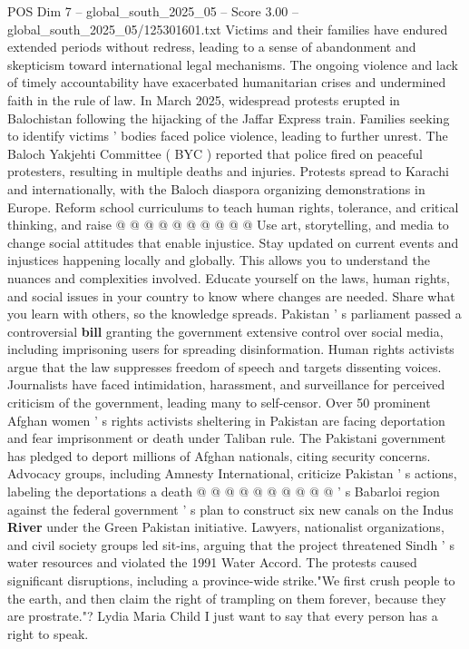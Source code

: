 \begin{textsample}{POS Dim 7 – global\_south\_2025\_05 – Score 3.00 – global\_south\_2025\_05/125301601.txt}
Victims and their families have endured extended periods without redress, leading to a sense of abandonment and skepticism toward international legal mechanisms.
The ongoing violence and lack of timely accountability have exacerbated humanitarian crises and undermined faith in the rule of law.
In March 2025, widespread protests erupted in Balochistan following the hijacking of the Jaffar Express train.
Families seeking to identify victims ' bodies faced police violence, leading to further unrest.
The Baloch Yakjehti Committee ( BYC ) reported that police fired on peaceful protesters, resulting in multiple deaths and injuries.
Protests spread to Karachi and internationally, with the Baloch diaspora organizing demonstrations in Europe.
Reform school curriculums to teach human rights, tolerance, and critical thinking, and raise @ @ @ @ @ @ @ @ @ @ Use art, storytelling, and media to change social attitudes that enable injustice.
Stay updated on current events and injustices happening locally and globally.
This allows you to understand the nuances and complexities involved.
Educate yourself on the laws, human rights, and social issues in your country to know where changes are needed.
Share what you learn with others, so the knowledge spreads.
Pakistan ' s parliament passed a controversial \textbf{bill} granting the government extensive control over social media, including imprisoning users for spreading disinformation.
Human rights activists argue that the law suppresses freedom of speech and targets dissenting voices.
Journalists have faced intimidation, harassment, and surveillance for perceived criticism of the government, leading many to self-censor.
Over 50 prominent Afghan women ' s rights activists sheltering in Pakistan are facing deportation and fear imprisonment or death under Taliban rule.
The Pakistani government has pledged to deport millions of Afghan nationals, citing security concerns.
Advocacy groups, including Amnesty International, criticize Pakistan ' s actions, labeling the deportations a death @ @ @ @ @ @ @ @ @ @ ' s Babarloi region against the federal government ' s plan to construct six new canals on the Indus \textbf{River} under the Green Pakistan initiative.
Lawyers, nationalist organizations, and civil society groups led sit-ins, arguing that the project threatened Sindh ' s water resources and violated the 1991 Water Accord.
The protests caused significant disruptions, including a province-wide strike."We first crush people to the earth, and then claim the right of trampling on them forever, because they are prostrate."?
Lydia Maria Child I just want to say that every person has a right to speak.

\end{textsample}
